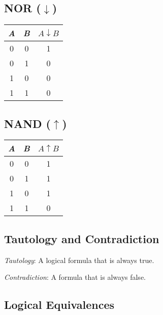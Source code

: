 \begin{multicols}{2}
	\vspace{1em}

	\subsection*{NOR (\(\downarrow\))}

	\begin{tabular}{ccc}
		\toprule
		\emph{A} & \emph{B} & \(A \downarrow B\) \\
		\midrule
		0   & 0   & 1                \\
		0   & 1   & 0                \\
		1   & 0   & 0                \\
		1   & 1   & 0                \\
		\bottomrule
	\end{tabular}

	\vspace{1em}

	\subsection*{NAND (\(\uparrow\))}

	\begin{tabular}{ccc}
		\toprule
		\emph{A} & \emph{B} & \(A \uparrow B\) \\
		\midrule
		0   & 0   & 1              \\
		0   & 1   & 1              \\
		1   & 0   & 1              \\
		1   & 1   & 0              \\
		\bottomrule
	\end{tabular}

\end{multicols}
\medskip

\subsection{Tautology and Contradiction}

\emph{Tautology}: A logical formula that is always true.

\emph{Contradiction}: A formula that is always false.

\newpage

\subsection{Logical Equivalences}

